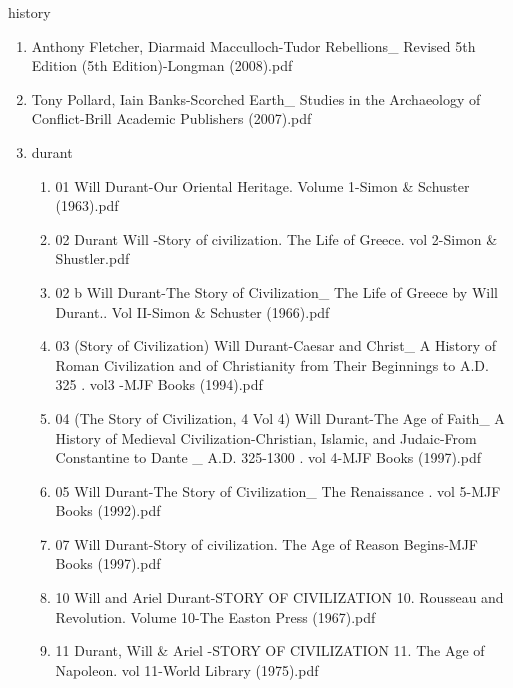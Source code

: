 \documentclass[11pt]{article}
\begin{document}
\item history
\label{sec-1-1-1-1-24}
\begin{enumerate}
\item Anthony Fletcher, Diarmaid Macculloch-Tudor Rebellions\_ Revised 5th Edition (5th Edition)-Longman (2008).pdf
\label{sec-1-1-1-1-24-1}

\item Tony Pollard, Iain Banks-Scorched Earth\_ Studies in the Archaeology of Conflict-Brill Academic Publishers (2007).pdf
\label{sec-1-1-1-1-24-2}

\item durant
\label{sec-1-1-1-1-24-3}
\begin{enumerate}
\item 01 Will Durant-Our Oriental Heritage. Volume 1-Simon \& Schuster (1963).pdf
\label{sec-1-1-1-1-24-3-1}

\item 02 Durant Will -Story of civilization. The Life of Greece. vol 2-Simon \& Shustler.pdf
\label{sec-1-1-1-1-24-3-2}

\item 02 b Will Durant-The Story of Civilization\_ The Life of Greece by Will Durant.. Vol II-Simon \& Schuster (1966).pdf
\label{sec-1-1-1-1-24-3-3}

\item 03 (Story of Civilization) Will Durant-Caesar and Christ\_ A History of Roman Civilization and of Christianity from Their Beginnings to A.D. 325 . vol3 -MJF Books (1994).pdf
\label{sec-1-1-1-1-24-3-4}

\item 04 (The Story of Civilization, 4 Vol 4) Will Durant-The Age of Faith\_ A History of Medieval Civilization-Christian, Islamic, and Judaic-From Constantine to Dante \_ A.D. 325-1300 . vol 4-MJF Books (1997).pdf
\label{sec-1-1-1-1-24-3-5}

\item 05 Will Durant-The Story of Civilization\_ The Renaissance . vol 5-MJF Books (1992).pdf
\label{sec-1-1-1-1-24-3-6}

\item 07 Will Durant-Story of civilization. The Age of Reason Begins-MJF Books (1997).pdf
\label{sec-1-1-1-1-24-3-7}

\item 10 Will and Ariel Durant-STORY OF CIVILIZATION 10. Rousseau and Revolution. Volume 10-The Easton Press (1967).pdf
\label{sec-1-1-1-1-24-3-8}

\item 11 Durant, Will \& Ariel -STORY OF CIVILIZATION 11. The Age of Napoleon. vol 11-World Library (1975).pdf
\label{sec-1-1-1-1-24-3-9}


\end{enumerate}
\end{enumerate}
\end{document}
